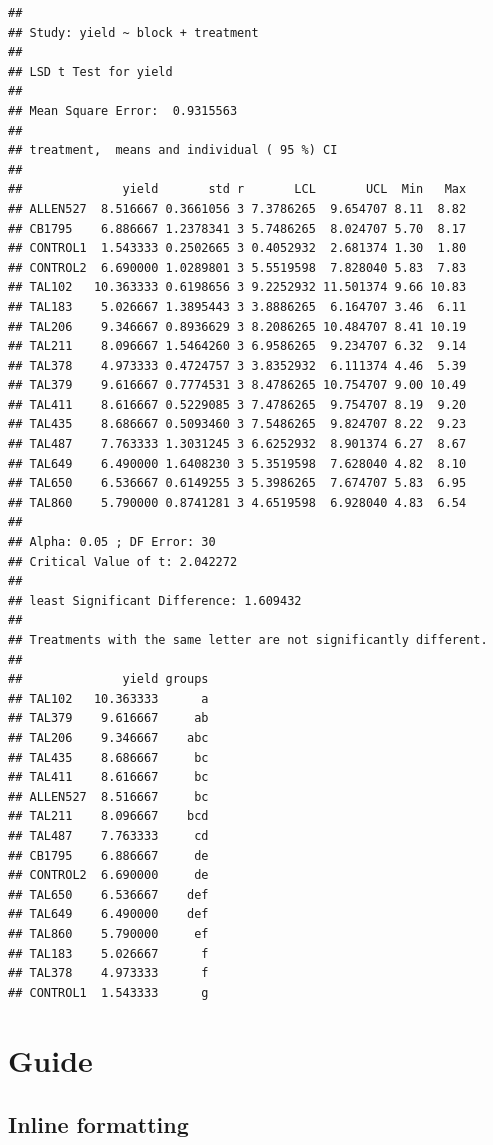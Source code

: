 \documentclass[
]{book}
\theoremstyle{definition}
\theoremstyle{definition}
\theoremstyle{definition}
\theoremstyle{definition}
\theoremstyle{remark}
\begin{document}
\begin{verbatim}
## 
## Study: yield ~ block + treatment
## 
## LSD t Test for yield 
## 
## Mean Square Error:  0.9315563 
## 
## treatment,  means and individual ( 95 %) CI
## 
##              yield       std r       LCL       UCL  Min   Max
## ALLEN527  8.516667 0.3661056 3 7.3786265  9.654707 8.11  8.82
## CB1795    6.886667 1.2378341 3 5.7486265  8.024707 5.70  8.17
## CONTROL1  1.543333 0.2502665 3 0.4052932  2.681374 1.30  1.80
## CONTROL2  6.690000 1.0289801 3 5.5519598  7.828040 5.83  7.83
## TAL102   10.363333 0.6198656 3 9.2252932 11.501374 9.66 10.83
## TAL183    5.026667 1.3895443 3 3.8886265  6.164707 3.46  6.11
## TAL206    9.346667 0.8936629 3 8.2086265 10.484707 8.41 10.19
## TAL211    8.096667 1.5464260 3 6.9586265  9.234707 6.32  9.14
## TAL378    4.973333 0.4724757 3 3.8352932  6.111374 4.46  5.39
## TAL379    9.616667 0.7774531 3 8.4786265 10.754707 9.00 10.49
## TAL411    8.616667 0.5229085 3 7.4786265  9.754707 8.19  9.20
## TAL435    8.686667 0.5093460 3 7.5486265  9.824707 8.22  9.23
## TAL487    7.763333 1.3031245 3 6.6252932  8.901374 6.27  8.67
## TAL649    6.490000 1.6408230 3 5.3519598  7.628040 4.82  8.10
## TAL650    6.536667 0.6149255 3 5.3986265  7.674707 5.83  6.95
## TAL860    5.790000 0.8741281 3 4.6519598  6.928040 4.83  6.54
## 
## Alpha: 0.05 ; DF Error: 30
## Critical Value of t: 2.042272 
## 
## least Significant Difference: 1.609432 
## 
## Treatments with the same letter are not significantly different.
## 
##              yield groups
## TAL102   10.363333      a
## TAL379    9.616667     ab
## TAL206    9.346667    abc
## TAL435    8.686667     bc
## TAL411    8.616667     bc
## ALLEN527  8.516667     bc
## TAL211    8.096667    bcd
## TAL487    7.763333     cd
## CB1795    6.886667     de
## CONTROL2  6.690000     de
## TAL650    6.536667    def
## TAL649    6.490000    def
## TAL860    5.790000     ef
## TAL183    5.026667      f
## TAL378    4.973333      f
## CONTROL1  1.543333      g
\end{verbatim}

\hypertarget{guide}{%
\chapter{Guide}\label{guide}}

\hypertarget{inline-formatting}{%
\section{Inline formatting}\label{inline-formatting}}
\end{document}
